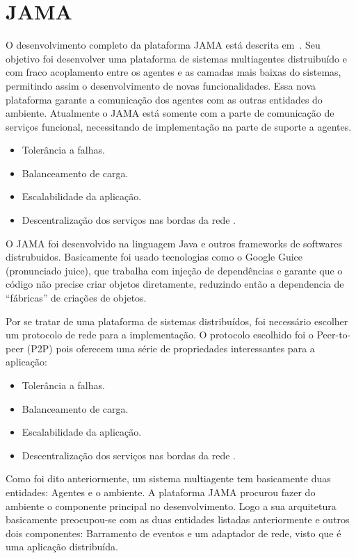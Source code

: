 \section{JAMA}

O desenvolvimento completo da plataforma JAMA está descrita em~\cite{parise11}. Seu objetivo foi desenvolver uma plataforma de sistemas multiagentes distruibuído e com fraco acoplamento entre os agentes e as camadas mais baixas do sistemas, permitindo assim o desenvolvimento de novas funcionalidades. Essa nova plataforma garante a comunicação dos agentes com as outras entidades do ambiente. Atualmente o JAMA está somente com a parte de comunicação de serviços funcional, necessitando de implementação na parte de suporte a agentes.
\begin{itemize}
	\item Tolerância a falhas.
	\item Balanceamento de carga.
	\item Escalabilidade da aplicação.
	\item Descentralização dos serviços nas bordas da rede	.
\end{itemize}


O JAMA foi desenvolvido na linguagem Java e outros frameworks de softwares distrubuidos. Basicamente foi usado tecnologias como o Google Guice (pronunciado juice), que trabalha com injeção de dependências e garante que o código não precise criar objetos diretamente, reduzindo então a dependencia de ``fábricas'' de criações de objetos.

Por se tratar de uma plataforma de sistemas distribuídos, foi necessário escolher um protocolo de rede para a implementação. O protocolo escolhido foi o Peer-to-peer (P2P) pois oferecem uma série de propriedades interessantes para a aplicação:
\begin{itemize}
	\item Tolerância a falhas.
	\item Balanceamento de carga.
	\item Escalabilidade da aplicação.
	\item Descentralização dos serviços nas bordas da rede	.
\end{itemize}

Como foi dito anteriormente, um sistema multiagente tem basicamente duas entidades: Agentes e o ambiente. A plataforma JAMA procurou fazer do ambiente o componente principal no desenvolvimento. Logo a sua arquitetura basicamente preocupou-se com as duas entidades listadas anteriormente e outros dois componentes: Barramento de eventos e um adaptador de rede, visto que é uma aplicação distribuída.


